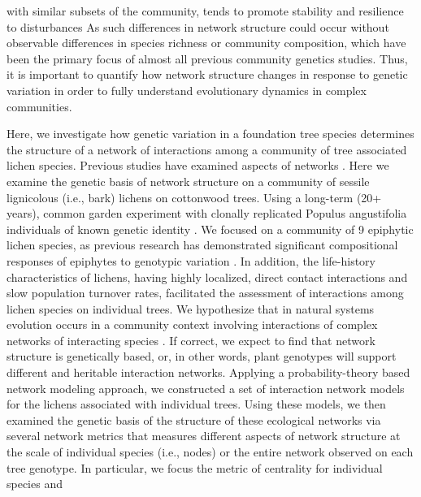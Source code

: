 \documentclass[11pt,twocolumn,twoside,lineno]{pnas-new}
\begin{document}
with similar subsets of the community, tends to promote stability and
resilience to disturbances \cite{Rohr2014OnSystems}%
As such differences in network structure could occur
without observable differences in species richness or community
composition, which have been the primary focus of almost all previous
community genetics studies. Thus, it is important to quantify how
network structure changes in response to genetic variation in order to
fully understand evolutionary dynamics in complex communities.

Here, we investigate how genetic variation in a foundation tree
species determines the structure of a network of interactions among a
community of tree associated lichen species. Previous studies have
examined aspects of networks \citep{Barbour2019TraitCommunities}. Here
we examine the genetic basis of network structure on a community of
sessile lignicolous (i.e., bark) lichens on cottonwood trees. Using a
long-term (20+ years), common garden experiment with clonally
replicated Populus angustifolia individuals of known genetic identity
. We focused on a community of 9 epiphytic lichen species, as previous
research has demonstrated significant compositional responses of
epiphytes to genotypic variation \citep{Winfree2011, Zytynska2011}. In
addition, the life-history characteristics of lichens, having highly
localized, direct contact interactions and slow population turnover
rates, facilitated the assessment of interactions among lichen species
on individual trees. We hypothesize that in natural systems evolution
occurs in a community context involving interactions of complex
networks of interacting species \cite{Lau2015a, Keith2017,
  Thompson2013, Bascompte2006}. If correct, we expect to find that
network structure is genetically based, or, in other words, plant
genotypes will support different and heritable interaction
networks. Applying a probability-theory based network modeling
approach, we constructed a set of interaction network models for the
lichens associated with individual trees. Using these models, we then
examined the genetic basis of the structure of these ecological
networks via several network metrics that measures different aspects
of network structure at the scale of individual species (i.e., nodes)
or the entire network observed on each tree genotype. In particular,
we focus the metric of centrality for individual species and
\end{document}
